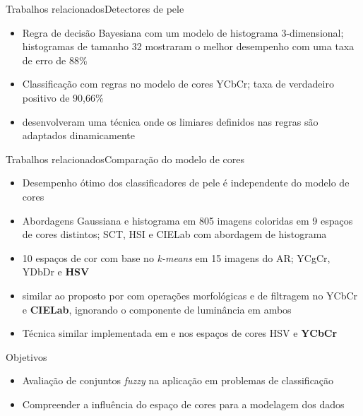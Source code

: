 \begin{frame}{Trabalhos relacionados}{Detectores de pele}
\begin{itemize}
    \item Regra de decisão Bayesiana com um modelo de histograma $3$-dimensional; histogramas de tamanho 32 mostraram o melhor desempenho com uma taxa de erro de 88\% \citep{jones:02}
    \item Classificação com regras no modelo de cores YCbCr; taxa de verdadeiro positivo de 90,66\% \citep{kovac:03}
    \item \citet{yogarajah:11} desenvolveram uma técnica onde os limiares definidos nas regras são adaptados dinamicamente
\end{itemize}
\end{frame}

\begin{frame}{Trabalhos relacionados}{Comparação do modelo de cores}
\begin{itemize}
    \item Desempenho ótimo dos classificadores de pele é independente do modelo de cores \citep{albiol:01}
    \item Abordagens Gaussiana e histograma em 805 imagens coloridas em 9 espaços de cores distintos; SCT, HSI e CIELab com abordagem de histograma \citep{jayaram:04}
    \item 10 espaços de cor com base no \emph{k-means} em 15 imagens do AR; YCgCr, YDbDr e \textbf{HSV} \citep{chaves:10}
    \item \citet{kaur:12} similar ao proposto por \citet{kovac:03} com operações morfológicas e de filtragem no YCbCr e \textbf{CIELab}, ignorando o componente de luminância em ambos
    \item Técnica similar implementada em \citet{shaik:15} e \citet{kumar:15} nos espaços de cores HSV e \textbf{YCbCr}
\end{itemize}
\end{frame}

\begin{frame}{Objetivos}
\begin{itemize}
    \item Avaliação de conjuntos \emph{fuzzy} na aplicação em problemas de classificação
    \item Compreender a influência do espaço de cores para a modelagem dos dados
\end{itemize}
\end{frame}
